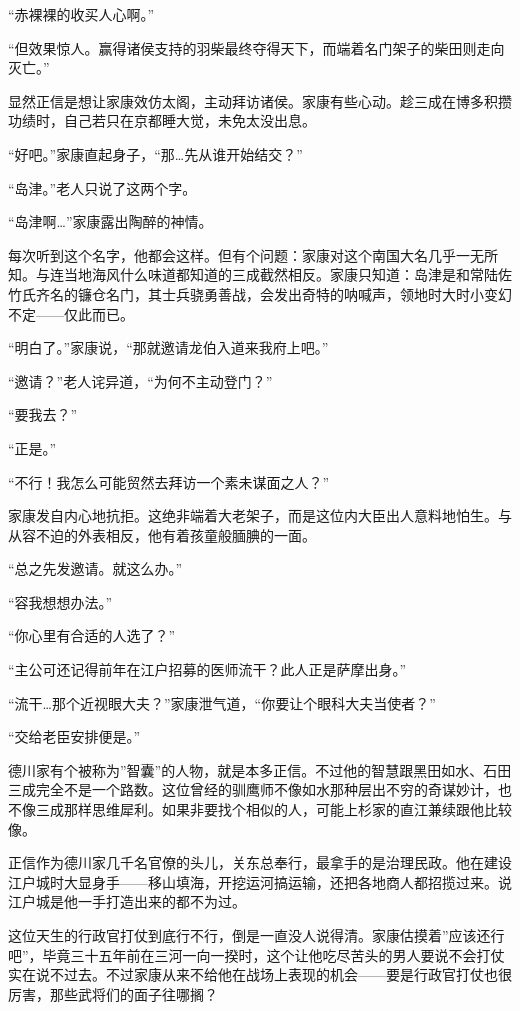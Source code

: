 \documentclass[
]{article}
\begin{document}
``赤裸裸的收买人心啊。''

``但效果惊人。赢得诸侯支持的羽柴最终夺得天下，而端着名门架子的柴田则走向灭亡。''

显然正信是想让家康效仿太阁，主动拜访诸侯。家康有些心动。趁三成在博多积攒功绩时，自己若只在京都睡大觉，未免太没出息。

``好吧。''家康直起身子，``那\ldots 先从谁开始结交？''

``岛津。''老人只说了这两个字。

``岛津啊\ldots{}''家康露出陶醉的神情。

每次听到这个名字，他都会这样。但有个问题：家康对这个南国大名几乎一无所知。与连当地海风什么味道都知道的三成截然相反。家康只知道：岛津是和常陆佐竹氏齐名的镰仓名门，其士兵骁勇善战，会发出奇特的呐喊声，领地时大时小变幻不定------仅此而已。

``明白了。''家康说，``那就邀请龙伯入道来我府上吧。''

``邀请？''老人诧异道，``为何不主动登门？''

``要我去？''

``正是。''

``不行！我怎么可能贸然去拜访一个素未谋面之人？''

家康发自内心地抗拒。这绝非端着大老架子，而是这位内大臣出人意料地怕生。与从容不迫的外表相反，他有着孩童般腼腆的一面。

``总之先发邀请。就这么办。''

``容我想想办法。''

``你心里有合适的人选了？''

``主公可还记得前年在江户招募的医师流干？此人正是萨摩出身。''

``流干\ldots 那个近视眼大夫？''家康泄气道，``你要让个眼科大夫当使者？''

``交给老臣安排便是。''

德川家有个被称为''智囊''的人物，就是本多正信。不过他的智慧跟黑田如水、石田三成完全不是一个路数。这位曾经的驯鹰师不像如水那种层出不穷的奇谋妙计，也不像三成那样思维犀利。如果非要找个相似的人，可能上杉家的直江兼续跟他比较像。

正信作为德川家几千名官僚的头儿，关东总奉行，最拿手的是治理民政。他在建设江户城时大显身手------移山填海，开挖运河搞运输，还把各地商人都招揽过来。说江户城是他一手打造出来的都不为过。

这位天生的行政官打仗到底行不行，倒是一直没人说得清。家康估摸着''应该还行吧''，毕竟三十五年前在三河一向一揆时，这个让他吃尽苦头的男人要说不会打仗实在说不过去。不过家康从来不给他在战场上表现的机会------要是行政官打仗也很厉害，那些武将们的面子往哪搁？
\end{document}

